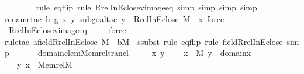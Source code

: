 \begin{isabellebody}
\ \ \ \ \ \ \ \isamarkupfalse%
{\isacharparenleft}{\kern0pt}rule\ eq{\isacharunderscore}{\kern0pt}flip{\isacharcomma}{\kern0pt}\ rule\ Rrel{\isacharunderscore}{\kern0pt}InEclose{\isacharunderscore}{\kern0pt}vimage{\isacharunderscore}{\kern0pt}eq{\isacharcomma}{\kern0pt}\ simp{\isacharcomma}{\kern0pt}\ simp{\isacharcomma}{\kern0pt}\ simp{\isacharcomma}{\kern0pt}\ simp{\isacharparenright}{\kern0pt}\isanewline
\ \ \ \isamarkupfalse%
{\isacharparenleft}{\kern0pt}rename{\isacharunderscore}{\kern0pt}tac\ h\ g\ x\ y{\isacharcomma}{\kern0pt}\ subgoal{\isacharunderscore}{\kern0pt}tac\ {\isachardoublequoteopen}y\ {\isasymin}\ Rrel{\isacharparenleft}{\kern0pt}InEclose{\isacharcomma}{\kern0pt}\ M{\isacharparenright}{\kern0pt}\ {\isacharminus}{\kern0pt}{\isacharbackquote}{\kern0pt}{\isacharbackquote}{\kern0pt}\ {\isacharbraceleft}{\kern0pt}x{\isacharbraceright}{\kern0pt}{\isachardoublequoteclose}{\isacharcomma}{\kern0pt}\ force{\isacharparenright}{\kern0pt}\isanewline
\ \ \isamarkupfalse%
\ Rrel{\isacharunderscore}{\kern0pt}InEclose{\isacharunderscore}{\kern0pt}vimage{\isacharunderscore}{\kern0pt}eq\isanewline
\ \ \ \isamarkupfalse%
\ force\isanewline
\ \ \isamarkupfalse%
{\isacharparenleft}{\kern0pt}rule{\isacharunderscore}{\kern0pt}tac\ a{\isacharequal}{\kern0pt}{\isachardoublequoteopen}field{\isacharparenleft}{\kern0pt}Rrel{\isacharparenleft}{\kern0pt}InEclose{\isacharcomma}{\kern0pt}\ M{\isacharparenright}{\kern0pt}{\isacharparenright}{\kern0pt}{\isachardoublequoteclose}\ \ b{\isacharequal}{\kern0pt}M\ \ ssubst{\isacharcomma}{\kern0pt}\ rule\ eq{\isacharunderscore}{\kern0pt}flip{\isacharcomma}{\kern0pt}\ rule\ field{\isacharunderscore}{\kern0pt}Rrel{\isacharunderscore}{\kern0pt}InEclose{\isacharcomma}{\kern0pt}\ simp{\isacharparenright}{\kern0pt}\isanewline
\ \ \isamarkupfalse%
%
\endisatagproof
{\isafoldproof}%
%
\isadelimproof
\isanewline
%
\endisadelimproof
\ \ \isanewline
{}\isamarkupfalse%
\ domain{\isacharunderscore}{\kern0pt}elem{\isacharunderscore}{\kern0pt}Memrel{\isacharunderscore}{\kern0pt}trancl\ {\isacharcolon}{\kern0pt}\ \isanewline
\ \ \ x\ y\ \isanewline
\ \ \ {\isachardoublequoteopen}x\ {\isasymin}\ M{\isachardoublequoteclose}\ {\isachardoublequoteopen}y\ {\isasymin}\ domain{\isacharparenleft}{\kern0pt}x{\isacharparenright}{\kern0pt}{\isachardoublequoteclose}\ \isanewline
\ \ \ {\isachardoublequoteopen}{\isacharless}{\kern0pt}y{\isacharcomma}{\kern0pt}\ x{\isachargreater}{\kern0pt}\ {\isasymin}\ Memrel{\isacharparenleft}{\kern0pt}M{\isacharparenright}{\kern0pt}{\isacharcircum}{\kern0pt}{\isacharplus}{\kern0pt}{\isachardoublequoteclose}\ \isanewline

\end{isabellebody}
